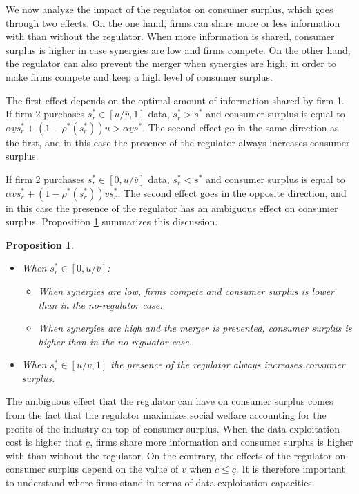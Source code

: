 \documentclass[a4paper,leqno]{article}%
\newtheorem{prop}{Proposition}
\renewcommand{\a}{\alpha}
\newcommand{\uv}{\underline{v}}
\newcommand{\ov}{\overline{v}}
\begin{document}
We now analyze the impact of the regulator on consumer surplus, which goes through two effects. On the one hand, firms can share more or less information with than without the regulator. When more information is shared, consumer surplus is higher in case synergies are low and firms compete. On the other hand, the regulator can also prevent the merger when synergies are high, in order to make firms compete and keep a high level of consumer surplus. 

\medskip

The first effect depends on the optimal amount of information shared by firm 1. If firm 2 purchases $s_r^*\in[u/\ov,1]$ data, $s_r^*>s^*$ and consumer surplus is equal to $\a \uv s_r^*+(1-\rho^*(s_r^*))u>\a \uv s^*$. The second effect go in the same direction as the first, and in this case the presence of the regulator always increases consumer surplus. 

\medskip

If firm 2 purchases $s_r^*\in[0,u/\ov]$ data, $s_r^*<s^*$ and consumer surplus is equal to $\a \uv s_r^*+(1-\rho^*(s_r^*))\ov s_r^*$. The second effect goes in the opposite direction, and in this case the presence of the regulator has an ambiguous effect on consumer surplus. Proposition \ref{prop:3} summarizes this discussion.


\medskip

\begin{prop}~~\label{prop:3}

\begin{itemize}
    \item When $s_r^*\in[0,u/\ov]$:
    \begin{itemize}
        \item When synergies are low, firms compete and consumer surplus is lower than in the no-regulator case.
        \item When synergies are high and the merger is prevented, consumer surplus is higher than in the no-regulator case.
    \end{itemize}
    \item When $s_r^*\in[u/\ov,1]$ the presence of the regulator always increases consumer surplus.
\end{itemize}

\end{prop}

\noindent The ambiguous effect that the regulator can have on consumer surplus comes from the fact that the regulator maximizes social welfare accounting for the profits of the industry on top of consumer surplus. When the data exploitation cost is higher that $\underline{c}$, firms share more information and consumer surplus is higher with than without the regulator. On the contrary, the effects of the regulator on consumer surplus depend on the value of $v$ when $c\leq \underline{c}$. It is therefore important to understand where firms stand in terms of data exploitation capacities. 
\end{document}

